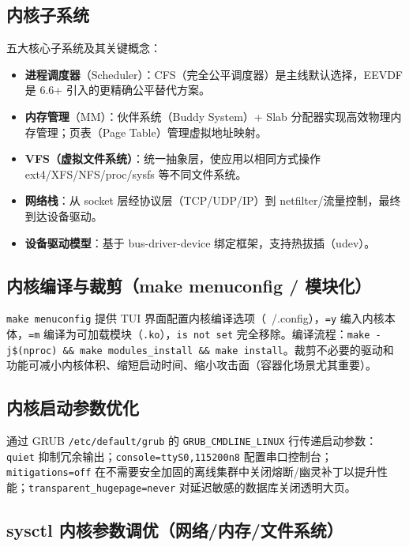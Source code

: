 \documentclass[12pt,UTF8]{ctexbook}
\begin{document}
\subsection{内核子系统}

五大核心子系统及其关键概念：

\begin{itemize}
\item \textbf{进程调度器}（Scheduler）：CFS（完全公平调度器）是主线默认选择，EEVDF 是 6.6+ 引入的更精确公平替代方案。
\item \textbf{内存管理}（MM）：伙伴系统（Buddy System）+ Slab 分配器实现高效物理内存管理；页表（Page Table）管理虚拟地址映射。
\item \textbf{VFS（虚拟文件系统）}：统一抽象层，使应用以相同方式操作 ext4/XFS/NFS/proc/sysfs 等不同文件系统。
\item \textbf{网络栈}：从 socket 层经协议层（TCP/UDP/IP）到 netfilter/流量控制，最终到达设备驱动。
\item \textbf{设备驱动模型}：基于 bus-driver-device 绑定框架，支持热拔插（udev）。
\end{itemize}

\subsection{内核编译与裁剪（make menuconfig / 模块化）}

\verb|make menuconfig| 提供 TUI 界面配置内核编译选项（~/.config），\verb|=y| 编入内核本体，\verb|=m| 编译为可加载模块（\texttt{.ko}），\verb|is not set| 完全移除。编译流程：\verb|make -j$(nproc) && make modules_install && make install|。裁剪不必要的驱动和功能可减小内核体积、缩短启动时间、缩小攻击面（容器化场景尤其重要）。

    \subsection{内核启动参数优化}

通过 GRUB \verb|/etc/default/grub| 的 \verb|GRUB_CMDLINE_LINUX| 行传递启动参数：\verb|quiet| 抑制冗余输出；\verb|console=ttyS0,115200n8| 配置串口控制台；\verb|mitigations=off| 在不需要安全加固的离线集群中关闭熔断/幽灵补丁以提升性能；\verb|transparent_hugepage=never| 对延迟敏感的数据库关闭透明大页。

    \subsection{sysctl 内核参数调优（网络/内存/文件系统）}
\end{document}
